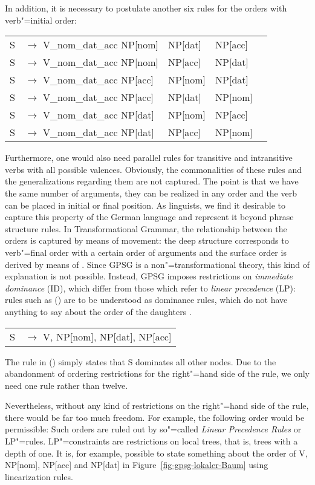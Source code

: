 \noindent
In addition, it is necessary to postulate another six rules for the orders with verb"=initial order:
\ea
\begin{tabular}[t]{@{}l@{ }l@{ }l@{ }l@{ }l}
S  & $\to$ V\_nom\_dat\_acc NP[nom]& NP[dat] & NP[acc]\\
S  & $\to$ V\_nom\_dat\_acc NP[nom]& NP[acc] & NP[dat]\\
S  & $\to$ V\_nom\_dat\_acc NP[acc]& NP[nom] & NP[dat]\\
S  & $\to$ V\_nom\_dat\_acc NP[acc]& NP[dat] & NP[nom]\\
S  & $\to$ V\_nom\_dat\_acc NP[dat]& NP[nom] & NP[acc]\\
S  & $\to$ V\_nom\_dat\_acc NP[dat]& NP[acc] & NP[nom]\\
\end{tabular}
\z

\noindent
Furthermore, one would also need parallel rules for transitive and intransitive verbs with all
possible valences. Obviously, the commonalities of these rules and the generalizations regarding
them are not captured. The point is that we have the same number of arguments, they can be
realized in any order and the verb can be placed in initial or final position. As linguists, we find it
desirable to capture this property of the German language and represent it beyond phrase structure 
rules. In Transformational Grammar, the relationship between the orders is captured by means of movement: the deep structure corresponds
to verb"=final order with a certain order of arguments and the surface order is derived by means of \movealpha. Since GPSG is a non"=transformational
theory, this kind of explanation is not possible. Instead, GPSG imposes restrictions on \emph{immediate dominance} (ID), which differ
from those which refer to \emph{linear precedence} (LP): rules such as () are to be understood as dominance rules, which do not
have anything to say about the order of the daughters \citep{Pullum82a}.
\ea
\begin{tabular}[t]{@{}l@{ }l}
S  & $\to$ V, NP[nom], NP[dat], NP[acc]\\
\end{tabular}
\z
The rule in () simply states that S dominates all other nodes. Due to the abandonment of ordering restrictions for the right"=hand side of the rule, we
only need one rule rather than twelve. 

Nevertheless, without any kind of restrictions on the right"=hand side of the rule, there would be far too much freedom. For example, the following order would be
permissible:
\z
Such orders are ruled out by so"=called \emph{Linear Precedence Rules} or LP"=rules. LP"=constraints are restrictions on
local trees, that is, trees with a depth of one. It is, for example, possible to state something
about the order of V, NP[nom], NP[acc] and NP[dat] in Figure~\vref{fig-gpsg-lokaler-Baum} using linearization
rules.

